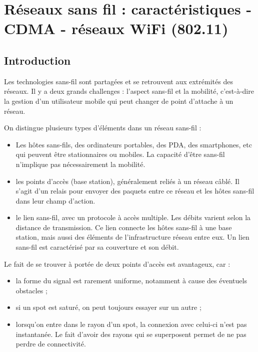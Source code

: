 \chapter{Réseaux sans fil : caractéristiques - CDMA - réseaux WiFi (802.11)}

	\section{Introduction}
Les technologies sans-fil sont partagées et se retrouvent aux extrémités des réseaux. Il y a deux grands challenges : l'aspect sans-fil et la mobilité, c'est-à-dire la gestion d'un utilisateur mobile qui peut changer de point d'attache à un réseau.
	
	On distingue plusieurs types d'éléments dans un réseau sans-fil :
	
	\begin{itemize}
		\item Les hôtes sans-fils, des ordinateurs portables, des PDA, des smartphones, etc qui peuvent être stationnaires ou mobiles. La capacité d'être sans-fil n'implique pas nécessairement la mobilité.
		
		\item les points d'accès (base station), généralement reliés à un réseau câblé. Il s'agit d'un relais pour envoyer des paquets entre ce réseau et les hôtes sans-fil dans leur champ d'action.
		
		\item le lien sans-fil, avec un protocole à accès multiple. Les débits varient selon la distance de transmission. Ce lien connecte les hôtes sans-fil à une base station, mais aussi des éléments de l'infrastructure réseau entre eux. Un lien sans-fil est caractérisé par sa couverture et son débit.
	\end{itemize}
	
	
	Le fait de se trouver à portée de deux points d'accès est avantageux, car :
	
	\begin{itemize}
		\item la forme du signal est rarement uniforme, notamment à cause des éventuels obstacles ;
		\item si un spot est saturé, on peut toujours essayer sur un autre ;
		\item lorsqu'on entre dans le rayon d'un spot, la connexion avec celui-ci n'est pas instantanée. Le fait d'avoir des rayons qui se superposent permet de ne pas perdre de connectivité.
	\end{itemize}
	
